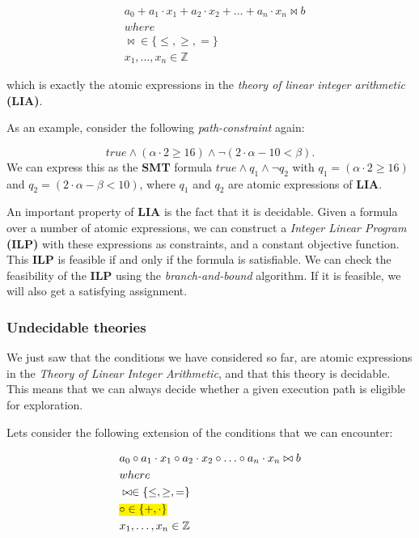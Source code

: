 		\begin{align*}
			& a_0 +  a_1 \cdot x_1 + a_2\cdot x_2 + \ldots + a_n \cdot x_n \bowtie b\\
			& where\\
			& \bowtie \in \{\leq, \geq, =\}\\
			& x_1, \ldots, x_n \in \mathbb{Z}			
		\end{align*}
		
	which is exactly the atomic expressions in the \emph{theory of linear integer arithmetic} \textbf{(LIA)}. 
	
	As an example, consider the following \emph{path-constraint} again:
	
	\begin{equation}
		true \land (\alpha \cdot 2 \geq 16) \land \neg (2\cdot \alpha - 10 < \beta).
	\end{equation}	
	We can express this as the \textbf{SMT} formula $true \land q_1 \land \neg q_2$ with $q_1 = (\alpha \cdot 2 \geq 16)$ and $q_2 = (2\cdot \alpha - \beta < 10)$, where $q_1$ and $q_2$ are atomic expressions of \textbf{LIA}.
	
	An important property of \textbf{LIA} is the fact that it is decidable. Given a formula over a number of atomic expressions, we can construct a \emph{Integer Linear Program} \textbf{(ILP)} with these expressions as constraints, and a constant objective function. This \textbf{ILP} is feasible if and only if the formula is satisfiable. We can check the feasibility of the \textbf{ILP} using the \emph{branch-and-bound} algorithm. If it is feasible, we will also get a satisfying assignment. 
	
	\subsubsection{Undecidable theories}
	
	We just saw that the conditions we have considered so far, are atomic expressions in the \emph{Theory of Linear Integer Arithmetic}, and that this theory is decidable. This means that we can always decide whether a given execution path is eligible for exploration.
	 
	Lets consider the following extension of the conditions that we can encounter:
	
	  
	 
	 \begin{align*}
	 	& a_0 \circ a_1 \cdot x_1 \circ a_2 \cdot x_2 \circ \ldots \circ a_n \cdot x_n \bowtie b \\
	 	& where \\
	 	& \bowtie \in  \{\leq, \geq, =\}\\
	 	& \text{\hl{$\circ \in  \{ +, \cdot \}$}}\\
	 	& x_1, \ldots, x_n \in \mathbb{Z}
	 \end{align*}
	
